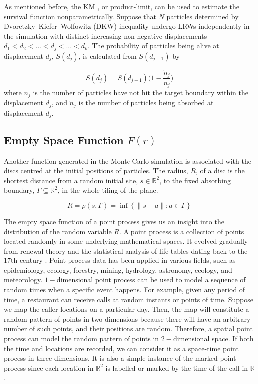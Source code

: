 As mentioned before, the KM \cite{kaplan1958nonparametric}, or
product-limit, can be used to estimate the survival function
nonparametrically. Suppose that $N$ particles determined by
Dvoretzky–Kiefer–Wolfowitz (DKW) inequality
\cite{dvoretzky1956asymptotic} undergo LRWs independently in the
simulation with distinct increasing non-negative displacements $d_1<
d_2< ...<d_j <...<d_k$. The probability of particles being alive at
displacement $d_j$, $S(d_j)$, is calculated from $S(d_{j-1})$ by

\begin{equation}\label{eq:km_disp}
  S(d_j) = S(d_{j-1}) \Big( 1-\frac{\tilde{n}_j}{n_j} \Big)
\end{equation}
where $n_j$ is the number of particles have not hit the target
boundary within the displacement $d_j$, and $\tilde{n}_j$ is the number of
particles being absorbed at displacement $d_j$. 




\subsection{Empty Space Function $F(r)$}

Another function generated in the Monte Carlo simulation is associated
with the discs centred at the initial positions of particles. The
radius, $R$, of a disc is the shortest distance from a random initial
site, $s \in \mathbb{R}^2$, to the fixed absorbing boundary, $\Gamma
\subseteq \mathbb{R}^2$, in the whole tiling of the plane.

\begin{equation}\label{eq:dist_point_set}
  R = \rho(s, \Gamma) = \inf \left\{ \lVert s-a \lVert : a \in \Gamma \right\}
\end{equation}

The empty space function \cite{baddeley2007spatial} of a point process
\cite{zahle1982random} gives us an insight into the distribution of
the random variable $R$. A point process is a collection of points
located randomly in some underlying mathematical spaces. It evolved
gradually from renewal theory and the statistical analysis of life
tables dating back to the $17$th century
\cite{daley2007introduction}. Point process data has been applied in
various fields, such as epidemiology, ecology, forestry, mining,
hydrology, astronomy, ecology, and meteorology. $1-$dimensional point
process can be used to model a sequence of random times when a
specific event happens. For example, given any period of time, a
restaurant can receive calls at random instants or points of
time. Suppose we map the caller locations on a particular day. Then,
the map will constitute a random pattern of points in two dimensions
because there will have an arbitrary number of such points, and their
positions are random. Therefore, a spatial point process can model the
random pattern of points in $2-$dimensional space. If both the time
and locations are recorded, we can consider it as a space-time point
process in three dimensions. It is also a simple instance of the
marked point process \cite{baddeley2007spatial} since each location in
$\mathbb{R}^2$ is labelled or marked by the time of the call in
$\mathbb{R}$.

